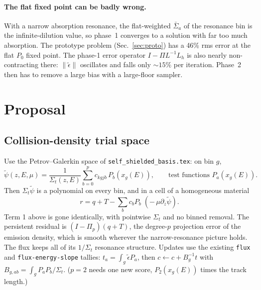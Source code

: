 \documentclass[11pt]{article}
\newcommand{\tpsi}{\tilde\psi}
\newcommand{\teps}{\tilde\epsilon}
\newcommand{\Sigt}{\Sigma_t}
\begin{document}
\paragraph{The flat fixed point can be badly wrong.} With a narrow absorption resonance,
the flat-weighted $\bar\Sigma_a$ of the resonance bin is the infinite-dilution value, so
phase~1 converges to a solution with far too much absorption. The prototype problem
(Sec.~\ref{sec:proto}) has a 46\% rms error at the flat $P_0$ fixed point. The phase-1
error operator $I-\Pi L^{-1}L_h$ is also nearly non-contracting there: $\|\teps\|$
oscillates and falls only $\sim 15\%$ per iteration. Phase~2 then has to remove a
large bias with a large-floor sampler.

\section{Proposal}

\subsection{Collision-density trial space}
Use the Petrov--Galerkin space of \texttt{self\_shielded\_basis.tex}: on bin $g$,
\begin{equation}
  \tpsi(z,E,\mu)=\frac{1}{\Sigt(z,E)}\sum_{b=0}^{p}c_{kgjb}\,P_b(x_g(E)),
  \qquad\text{test functions }P_a(x_g(E)) .
\end{equation}
Then $\Sigt\tpsi$ is a polynomial on every bin, and in a cell of a homogeneous material
\begin{equation}
  r = q + T - \textstyle\sum_b c_b P_b \;(-\,\mu\partial_z\tpsi).
\end{equation}
Term 1 above is gone identically, with pointwise $\Sigt$ and no binned removal. The
persistent residual is $(I-\Pi_p)(q+T)$, the degree-$p$ projection error of the emission
density, which is smooth wherever the narrow-resonance picture holds. The flux keeps all
of its $1/\Sigt$ resonance structure. Updates use the existing \texttt{flux} and
\texttt{flux-energy-slope} tallies: $t_a=\int_g\teps P_a$, then $c\leftarrow c+B_g^{-1}t$
with $B_{g,ab}=\int_g P_aP_b/\Sigt$. ($p=2$ needs one new score, $P_2(x_g(E))$ times the
track length.)
\end{document}
